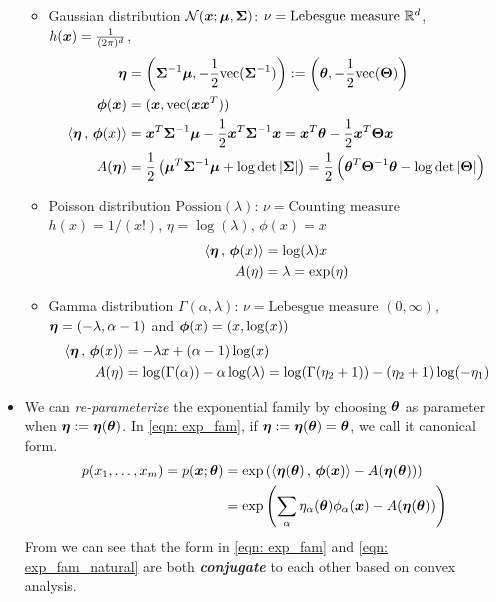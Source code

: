 \documentclass[11pt]{article}
\begin{document}
\begin{itemize}
\begin{itemize}
\item Gaussian distribution ${\mathcal N}(\boldsymbol{x}; \boldsymbol{\mu}, \boldsymbol{\Sigma})$: $\nu = \text{Lebesgue measure } {\mathbb R}^d$, $h(\boldsymbol{x}) = \frac{1}{(2\pi)^d}$, 
\begin{align}
\boldsymbol{\eta} &= \left(\boldsymbol{\Sigma}^{-1}\boldsymbol{\mu}, - \frac{1}{2} \text{vec}(\boldsymbol{\Sigma}^{-1})\right) : = \left(\boldsymbol{\theta}, -\frac{1}{2}\text{vec}(\boldsymbol{\Theta})\right) \label{eqn: gaussian_natural_param}\\
\boldsymbol{\phi}(\boldsymbol{x}) &= (\boldsymbol{x}, \text{vec}(\boldsymbol{x}\boldsymbol{x}^{T}))  \label{eqn: gaussian_sufficient_stats}\\
\left\langle \boldsymbol{\eta}\,,\, \boldsymbol{\phi}(x) \right\rangle &= \boldsymbol{x}^{T}\boldsymbol{\Sigma}^{-1}\boldsymbol{\mu} - \frac{1}{2}\boldsymbol{x}^{T}\boldsymbol{\Sigma}^{-1}\boldsymbol{x} = \boldsymbol{x}^{T}\boldsymbol{\theta} - \frac{1}{2}\boldsymbol{x}^{T}\boldsymbol{\Theta}\boldsymbol{x} \nonumber\\
A(\boldsymbol{\eta}) &= \frac{1}{2}\left(\boldsymbol{\mu}^{T}\boldsymbol{\Sigma}^{-1}\boldsymbol{\mu} + \log \det\left\lvert \boldsymbol{\Sigma} \right\rvert\right) = \frac{1}{2}\left(\boldsymbol{\theta}^{T}\boldsymbol{\Theta}^{-1}\boldsymbol{\theta} - \log \det\left\lvert \boldsymbol{\Theta} \right\rvert\right)  \label{eqn: gaussian_partition_fun}
\end{align}

\item Poisson distribution $\text{Possion}(\lambda)$: $\nu = \text{Counting measure}$ $h(x) = 1/(x!)$, $\eta =  \log(\lambda)$, $\phi(x) = x$
\begin{align*}
\left\langle \boldsymbol{\eta}\,,\, \boldsymbol{\phi}(x) \right\rangle &= \log(\lambda)x \\
A(\eta) &=\lambda =  \exp(\eta)
\end{align*}

\item Gamma distribution $\Gamma(\alpha, \lambda)$: $\nu = \text{Lebesgue measure } (0,\infty)$, $\boldsymbol{\eta} = (-\lambda, \alpha - 1)$  and $\boldsymbol{\phi}(x) = (x, \log(x))$
\begin{align*}
\left\langle \boldsymbol{\eta}\,,\, \boldsymbol{\phi}(x) \right\rangle &= -\lambda x + (\alpha - 1)\log(x)  \\
A(\eta) &=\log(\Gamma(\alpha)) - \alpha \log(\lambda) = \log(\Gamma(\eta_2 + 1)) - (\eta_2 + 1) \log(-\eta_1) 
\end{align*}
\end{itemize}


\item We can \emph{re-parameterize} the exponential family by choosing $\boldsymbol{\theta}$ as parameter when $\boldsymbol{\eta}:= \boldsymbol{\eta}(\boldsymbol{\theta})$. In \eqref{eqn: exp_fam}, if $\boldsymbol{\eta}:= \boldsymbol{\eta}(\boldsymbol{\theta}) = \boldsymbol{\theta}$, we call it canonical form. 
\begin{align}
p(x_1, \ldots, x_{m}) = p(\boldsymbol{x}; \boldsymbol{\theta}) &= \exp\left(\left\langle \boldsymbol{\eta}(\boldsymbol{\theta})\,,\, \boldsymbol{\phi}(\boldsymbol{x}) \right\rangle - A(\boldsymbol{\eta}(\boldsymbol{\theta}))\right) \nonumber \\
&= \exp\left(\sum_{\alpha}\eta_{\alpha}(\boldsymbol{\theta})\phi_{\alpha}(\boldsymbol{x}) -  A(\boldsymbol{\eta}(\boldsymbol{\theta}))\right) \label{eqn: exp_fam_natural}
\end{align}
From \citep{wainwright2008graphical} we can see that the form in \eqref{eqn: exp_fam} and \eqref{eqn: exp_fam_natural} are both \emph{\textbf{conjugate}} to each other based on convex analysis.



\end{itemize}
\end{document}
